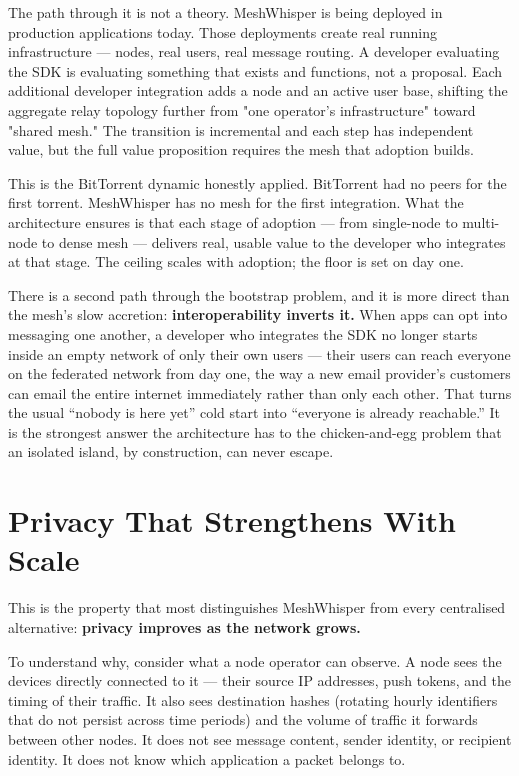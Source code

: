 \documentclass[11pt, a4paper]{article}
\begin{document}
The path through it is not a theory. MeshWhisper is being deployed in production applications today. Those deployments create real running infrastructure --- nodes, real users, real message routing. A developer evaluating the SDK is evaluating something that exists and functions, not a proposal. Each additional developer integration adds a node and an active user base, shifting the aggregate relay topology further from "one operator's infrastructure" toward "shared mesh." The transition is incremental and each step has independent value, but the full value proposition requires the mesh that adoption builds.

This is the BitTorrent dynamic honestly applied. BitTorrent had no peers for the first torrent. MeshWhisper has no mesh for the first integration. What the architecture ensures is that each stage of adoption — from single-node to multi-node to dense mesh — delivers real, usable value to the developer who integrates at that stage. The ceiling scales with adoption; the floor is set on day one.

There is a second path through the bootstrap problem, and it is more direct than the mesh's slow accretion: \textbf{interoperability inverts it.} When apps can opt into messaging one another, a developer who integrates the SDK no longer starts inside an empty network of only their own users — their users can reach everyone on the federated network from day one, the way a new email provider's customers can email the entire internet immediately rather than only each other. That turns the usual ``nobody is here yet'' cold start into ``everyone is already reachable.'' It is the strongest answer the architecture has to the chicken-and-egg problem that an isolated island, by construction, can never escape.

\section{Privacy That Strengthens With Scale}

This is the property that most distinguishes MeshWhisper from every centralised alternative: \textbf{privacy improves as the network grows.}

To understand why, consider what a node operator can observe. A node sees the devices directly connected to it — their source IP addresses, push tokens, and the timing of their traffic. It also sees destination hashes (rotating hourly identifiers that do not persist across time periods) and the volume of traffic it forwards between other nodes. It does not see message content, sender identity, or recipient identity. It does not know which application a packet belongs to.
\end{document}
